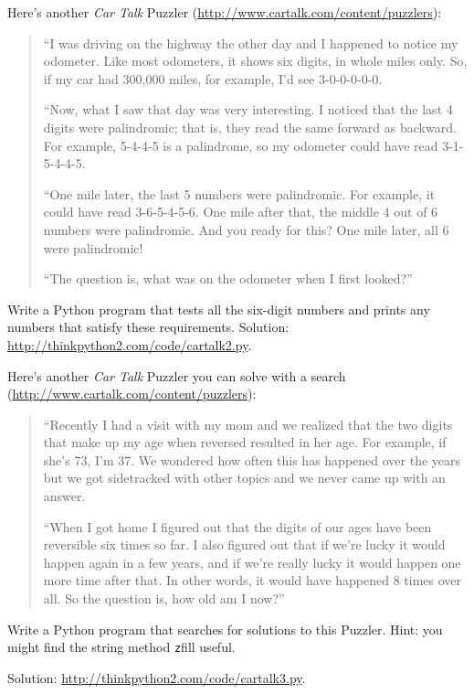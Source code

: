 \documentclass[
DIV=11,
fontsize=12,
twoside,
headinclude=false,
titlepage=firstiscover,
abstract=true,
headsepline=true,
footsepline=true,
chapterprefix=true, %
headings=big,
bibliography=totoc,%
captions=tableheading
]{scrbook}
\theoremstyle{definition}
\begin{document}
\begin{exercise}
\normalfont
Here's another {\em Car Talk}
Puzzler (\url{http://www.cartalk.com/content/puzzlers}):

\begin{quote}
``I was driving on the highway the other day and I happened to
notice my odometer. Like most odometers, it shows six digits,
in whole miles only. So, if my car had 300,000
miles, for example, I'd see 3-0-0-0-0-0.

``Now, what I saw that day was very interesting. I noticed that the
last 4 digits were palindromic; that is, they read the same forward as
backward. For example, 5-4-4-5 is a palindrome, so my odometer
could have read 3-1-5-4-4-5.

``One mile later, the last 5 numbers were palindromic. For example, it
could have read 3-6-5-4-5-6.  One mile after that, the middle 4 out of
6 numbers were palindromic.  And you ready for this? One mile later,
all 6 were palindromic!

``The question is, what was on the odometer when I first looked?''
\end{quote}

Write a Python program that tests all the six-digit numbers and prints
any numbers that satisfy these requirements.  
Solution: \url{http://thinkpython2.com/code/cartalk2.py}.

\end{exercise}


\begin{exercise}
\normalfont
Here's another {\em Car Talk} Puzzler you can solve with a
search (\url{http://www.cartalk.com/content/puzzlers}):

\begin{quote}
``Recently I had a visit with my mom and we realized that
the two digits that make up my age when reversed resulted in her
age. For example, if she's 73, I'm 37. We wondered how often this has
happened over the years but we got sidetracked with other topics and
we never came up with an answer.

``When I got home I figured out that the digits of our ages have been
reversible six times so far. I also figured out that if we're lucky it
would happen again in a few years, and if we're really lucky it would
happen one more time after that. In other words, it would have
happened 8 times over all. So the question is, how old am I now?''

\end{quote}

Write a Python program that searches for solutions to this Puzzler.
Hint: you might find the string method {\texttt zfill} useful.

Solution: \url{http://thinkpython2.com/code/cartalk3.py}.

\end{exercise}
\end{document}
